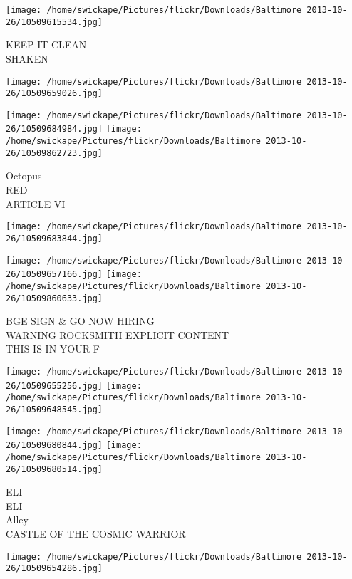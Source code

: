 \documentclass[10pt,letterpaper]{article}
\begin{document}
\vspace{0.25in}
\texttt{[image: /home/swickape/Pictures/flickr/Downloads/Baltimore 2013-10-26/10509615534.jpg]}

KEEP IT CLEAN\\
SHAKEN\\
\pagebreak

\texttt{[image: /home/swickape/Pictures/flickr/Downloads/Baltimore 2013-10-26/10509659026.jpg]}

\vspace{0.25in}
\texttt{[image: /home/swickape/Pictures/flickr/Downloads/Baltimore 2013-10-26/10509684984.jpg]}
\texttt{[image: /home/swickape/Pictures/flickr/Downloads/Baltimore 2013-10-26/10509862723.jpg]}

Octopus\\
RED\\
ARTICLE VI\\
\pagebreak

\texttt{[image: /home/swickape/Pictures/flickr/Downloads/Baltimore 2013-10-26/10509683844.jpg]}

\vspace{0.25in}
\texttt{[image: /home/swickape/Pictures/flickr/Downloads/Baltimore 2013-10-26/10509657166.jpg]}
\texttt{[image: /home/swickape/Pictures/flickr/Downloads/Baltimore 2013-10-26/10509860633.jpg]}

BGE SIGN \& GO NOW HIRING\\
WARNING ROCKSMITH EXPLICIT CONTENT\\
THIS IS IN YOUR F\\
\pagebreak

\texttt{[image: /home/swickape/Pictures/flickr/Downloads/Baltimore 2013-10-26/10509655256.jpg]}
\texttt{[image: /home/swickape/Pictures/flickr/Downloads/Baltimore 2013-10-26/10509648545.jpg]}

\texttt{[image: /home/swickape/Pictures/flickr/Downloads/Baltimore 2013-10-26/10509680844.jpg]}
\texttt{[image: /home/swickape/Pictures/flickr/Downloads/Baltimore 2013-10-26/10509680514.jpg]}

ELI\\
ELI\\
Alley\\
CASTLE OF THE COSMIC WARRIOR\\
\pagebreak

\texttt{[image: /home/swickape/Pictures/flickr/Downloads/Baltimore 2013-10-26/10509654286.jpg]}
\end{document}
